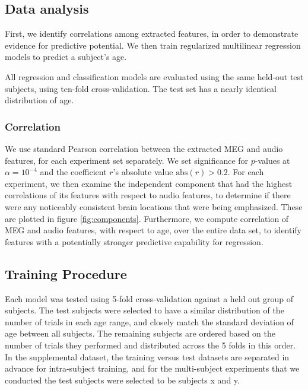 \documentclass[utf8]{frontiersSCNS} %
\begin{document}
\subsection{Data analysis}

First, we identify correlations among extracted features, in order to demonstrate evidence for predictive potential. We then train regularized multilinear regression models to predict a subject's age.

All regression and classification models are evaluated using the same held-out test subjects, using ten-fold cross-validation. The test set has a nearly identical distribution of age.

\subsubsection{Correlation}

We use standard Pearson correlation between the extracted MEG and audio features, for each experiment set separately. We set significance for $p$-values at $\alpha = 10^{-4}$ and the coefficient $r$'s absolute value $\text{abs}(r) > 0.2$. For each experiment, we then examine the independent component that had the highest correlations of its features with respect to audio features, to determine if there were any noticeably consistent brain locations that were being emphasized. These are plotted in figure \ref{fig:components}. Furthermore, we compute correlation of MEG and audio features, with respect to age, over the entire data set, to identify features with a potentially stronger predictive capability for regression.

\subsection{Training Procedure} \label{sec:train_proc}

Each model was tested using 5-fold cross-validation against a held out group of subjects. The test subjects were selected to have a similar distribution of the number of trials in each age range, and closely match the standard deviation of age between all subjects. The remaining subjects are ordered based on the number of trials they performed and distributed across the 5 folds in this order. In the supplemental dataset, the training versus test datasets are separated in advance for intra-subject training, and for the multi-subject experiments that we conducted the test subjects were selected to be subjects x and y.
\end{document}
